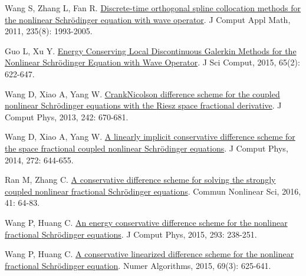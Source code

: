 \begin{thebibliography}{77}
    Wang S, Zhang L, Fan R.
    \newblock \href{https://linkinghub.elsevier.com/retrieve/pii/S0377042710005510}{Discrete-time orthogonal spline collocation methods for the nonlinear {{Schr{\"o}dinger}} equation with wave operator}\allowbreak[J].
    \newblock J Comput Appl Math, 2011, 235\allowbreak (8): 1993-2005.
    
    Guo L, Xu Y.
    \newblock \href{http://link.springer.com/10.1007/s10915-014-9977-z}{Energy {{Conserving Local Discontinuous Galerkin Methods}} for the {{Nonlinear Schr{\"o}dinger Equation}} with {{Wave Operator}}}\allowbreak[J].
    \newblock J Sci Comput, 2015, 65\allowbreak (2): 622-647.
    
    Wang D, Xiao A, Yang W.
    \newblock \href{https://www.sciencedirect.com/science/article/pii/S0021999113001563}{Crank{\textendash}{{Nicolson}} difference scheme for the coupled nonlinear {{Schr{\"o}dinger}} equations with the {{Riesz}} space fractional derivative}\allowbreak[J].
    \newblock J Comput Phys, 2013, 242: 670-681.
    
    Wang D, Xiao A, Yang W.
    \newblock \href{https://www.sciencedirect.com/science/article/pii/S0021999114003167}{A linearly implicit conservative difference scheme for the space fractional coupled nonlinear {{Schr{\"o}dinger}} equations}\allowbreak[J].
    \newblock J Comput Phys, 2014, 272: 644-655.
    
    Ran M, Zhang C.
    \newblock \href{https://linkinghub.elsevier.com/retrieve/pii/S1007570416301289}{A conservative difference scheme for solving the strongly coupled nonlinear fractional {{Schr{\"o}dinger}} equations}\allowbreak[J].
    \newblock Commun Nonlinear Sci, 2016, 41: 64-83.
    
    Wang P, Huang C.
    \newblock \href{https://www.sciencedirect.com/science/article/pii/S0021999114002241}{An energy conservative difference scheme for the nonlinear fractional {{Schr{\"o}dinger}} equations}\allowbreak[J].
    \newblock J Comput Phys, 2015, 293: 238-251.
    
    Wang P, Huang C.
    \newblock \href{https://doi.org/10.1007/s11075-014-9917-x}{A conservative linearized difference scheme for the nonlinear fractional {{Schr{\"o}dinger}} equation}\allowbreak[J].
    \newblock Numer Algorithms, 2015, 69\allowbreak (3): 625-641.
    

\end{thebibliography}
